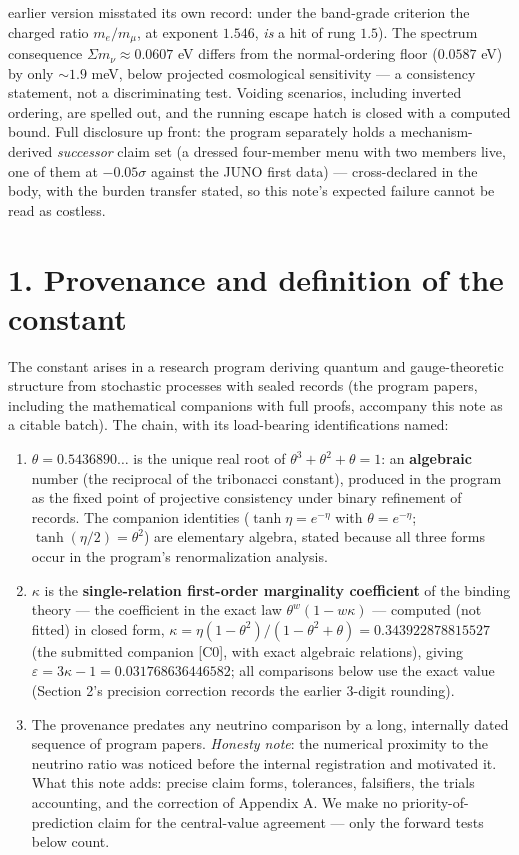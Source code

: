\documentclass[11pt]{article}
\begin{document}
earlier version misstated its own record: under the band-grade criterion the charged ratio $m_e/m_\mu$, at exponent $1.546$, \emph{is} a hit of rung $1.5$).  The spectrum consequence $\Sigma m_\nu \approx 0.0607$ eV differs from the normal-ordering floor ($0.0587$ eV) by only $\sim 1.9$ meV, below projected cosmological sensitivity — a consistency statement, not a discriminating test.  Voiding scenarios, including inverted ordering, are spelled out, and the running escape hatch is closed with a computed bound.  Full disclosure up front: the program separately holds a mechanism-derived \emph{successor} claim set (a dressed four-member menu with two members live, one of them at $-0.05\sigma$ against the JUNO first data) — cross-declared in the body, with the burden transfer stated, so this note's expected failure cannot be read as costless.

\section*{1. Provenance and definition of the constant}
The constant arises in a research program deriving quantum and gauge-theoretic structure from stochastic processes with sealed records (the program papers, including the mathematical companions with full proofs, accompany this note as a citable batch).  The chain, with its load-bearing identifications named:

\begin{enumerate}
\item $\theta = 0.5436890\ldots$ is the unique real root of $\theta^3 + \theta^2 + \theta = 1$: an \textbf{algebraic} number (the reciprocal of the tribonacci constant), produced in the program as the fixed point of projective consistency under binary refinement of records.  The companion identities ($\tanh\eta = e^{-\eta}$ with $\theta = e^{-\eta}$; $\tanh(\eta/2) = \theta^2$) are elementary algebra, stated because all three forms occur in the program's renormalization analysis.
\item $\kappa$ is the \textbf{single-relation first-order marginality coefficient} of the binding theory — the coefficient in the exact law $\theta^w(1 - w\kappa)$ — computed (not fitted) in closed form, $\kappa = \eta(1-\theta^2)/(1-\theta^2+\theta) = 0.343922878815527$ (the submitted companion [C0], with exact algebraic relations), giving $\varepsilon = 3\kappa - 1 = 0.031768636446582$; all comparisons below use the exact value (Section 2's precision correction records the earlier 3-digit rounding).
\item The provenance predates any neutrino comparison by a long, internally dated sequence of program papers.  \emph{Honesty note}: the numerical proximity to the neutrino ratio was noticed before the internal registration and motivated it.  What this note adds: precise claim forms, tolerances, falsifiers, the trials accounting, and the correction of Appendix A.  We make no priority-of-prediction claim for the central-value agreement — only the forward tests below count.
\end{enumerate}
\end{document}
